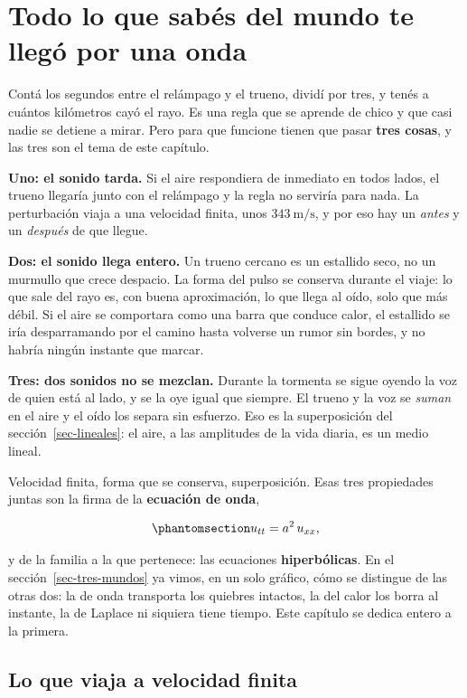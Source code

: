 \documentclass[
  spanish,
  a4paper,
]{scrbook}
\theoremstyle{definition}
\theoremstyle{plain}
\theoremstyle{definition}
\theoremstyle{plain}
\theoremstyle{definition}
\theoremstyle{remark}
\begin{document}
\section{Todo lo que sabés del mundo te llegó por una
onda}\label{sec-hip-motivacion}

Contá los segundos entre el relámpago y el trueno, dividí por tres, y
tenés a cuántos kilómetros cayó el rayo. Es una regla que se aprende de
chico y que casi nadie se detiene a mirar. Pero para que funcione tienen
que pasar \textbf{tres cosas}, y las tres son el tema de este capítulo.

\textbf{Uno: el sonido tarda.} Si el aire respondiera de inmediato en
todos lados, el trueno llegaría junto con el relámpago y la regla no
serviría para nada. La perturbación viaja a una velocidad finita, unos
\(343\ \text{m/s}\), y por eso hay un \emph{antes} y un \emph{después}
de que llegue.

\textbf{Dos: el sonido llega entero.} Un trueno cercano es un estallido
seco, no un murmullo que crece despacio. La forma del pulso se conserva
durante el viaje: lo que sale del rayo es, con buena aproximación, lo
que llega al oído, solo que más débil. Si el aire se comportara como una
barra que conduce calor, el estallido se iría desparramando por el
camino hasta volverse un rumor sin bordes, y no habría ningún instante
que marcar.

\textbf{Tres: dos sonidos no se mezclan.} Durante la tormenta se sigue
oyendo la voz de quien está al lado, y se la oye igual que siempre. El
trueno y la voz se \emph{suman} en el aire y el oído los separa sin
esfuerzo. Eso es la superposición del sección~\ref{sec-lineales}: el
aire, a las amplitudes de la vida diaria, es un medio lineal.

Velocidad finita, forma que se conserva, superposición. Esas tres
propiedades juntas son la firma de la \textbf{ecuación de onda},

\begin{equation}\protect\phantomsection\label{eq-hip-onda-1d}{
u_{tt} = a^2\,u_{xx},
}\end{equation}

y de la familia a la que pertenece: las ecuaciones
\textbf{hiperbólicas}. En el sección~\ref{sec-tres-mundos} ya vimos, en
un solo gráfico, cómo se distingue de las otras dos: la de onda
transporta los quiebres intactos, la del calor los borra al instante, la
de Laplace ni siquiera tiene tiempo. Este capítulo se dedica entero a la
primera.

\subsection{Lo que viaja a velocidad finita}\label{sec-hip-catalogo}
\end{document}
